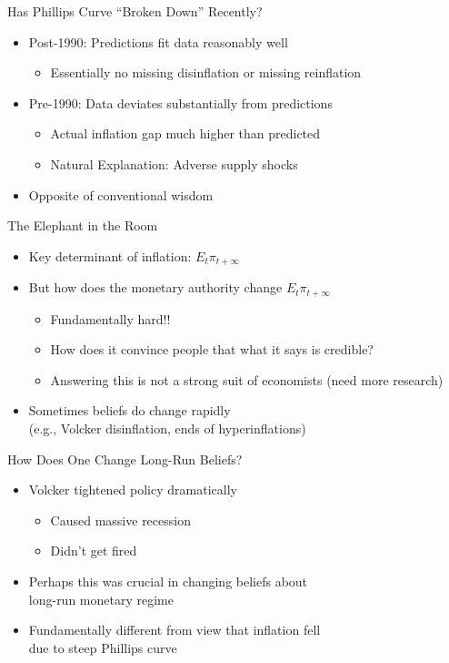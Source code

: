 \documentclass[11pt,aspectratio=169,xcolor={dvipsnames},hyperref={pdftex,pdfpagemode=UseNone,hidelinks,pdfdisplaydoctitle=true},usepdftitle=false]{beamer}
\begin{document}
\begin{frame}{Has Phillips Curve ``Broken Down'' Recently?}
	\begin{itemize}
		\itemsep1em 
		\item Post-1990: Predictions fit data reasonably well
		\begin{itemize}
			\item Essentially no missing disinflation or missing reinflation
		\end{itemize}
		\item Pre-1990: Data deviates substantially from predictions
		\begin{itemize}
			\item Actual inflation gap much higher than predicted
			\item Natural Explanation: Adverse supply shocks 
		\end{itemize}
		\item Opposite of conventional wisdom
	\end{itemize}
\end{frame}



\begin{frame}{The Elephant in the Room}
	\begin{itemize}
		\itemsep1em 
		\item Key determinant of inflation: $E_t \pi_{t+\infty}$
		\item But how does the monetary authority change $E_t \pi_{t+\infty}$ 
		\begin{itemize}
			\item Fundamentally hard!!
			\item How does it convince people that what it says is credible?
			\item Answering this is not a strong suit of economists (need more research)
		\end{itemize}
		\item Sometimes beliefs do change rapidly \\ (e.g., Volcker disinflation, ends of hyperinflations)
	\end{itemize}
\end{frame}

\begin{frame}{How Does One Change Long-Run Beliefs?}
	\begin{itemize}
		\itemsep1em 
		\item Volcker tightened policy dramatically
		\begin{itemize}
			\item Caused massive recession
			\item Didn't get fired 
		\end{itemize}
		\item Perhaps this was crucial in changing beliefs about \\ long-run monetary regime
		\item Fundamentally different from view that inflation fell \\ due to steep Phillips curve	
	\end{itemize}
\end{frame}
\end{document}
